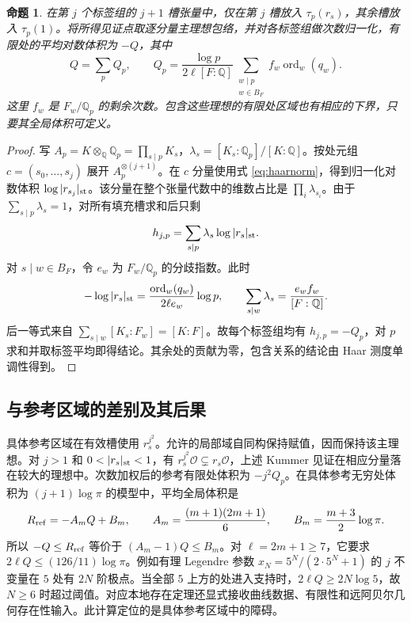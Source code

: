 \documentclass[UTF8,fontset=none,zihao=-4,a4paper]{ctexart}
\newtheorem{claim}{命题}
\newcommand{\OO}{\mathcal O}
\newcommand{\Q}{\mathbb Q}
\newcommand{\ord}{\operatorname{ord}}
\begin{document}
\begin{claim}
在第 \(j\) 个标签组的 \(j+1\) 槽张量中，仅在第 \(j\) 槽放入 \(\tau_p(r_s)\)，其余槽放入 \(\tau_p(1)\)。将所得见证点取逐分量主理想包络，并对各标签组做次数归一化，有限处的平均对数体积为 \(-Q\)，其中
\[
 Q=\sum_p Q_p,\qquad
 Q_p=\frac{\log p}{2\ell[F:\Q]}
      \sum_{\substack{w\mid p\\w\in B_F}} f_w\ord_w(q_w).
\]
这里 \(f_w\) 是 \(F_w/\Q_p\) 的剩余次数。包含这些理想的有限处区域也有相应的下界，只要其全局体积可定义。
\end{claim}
\begin{proof}
写 \(A_p=K\otimes_{\Q}\Q_p=\prod_{s\mid p}K_s\)，\(\lambda_s=[K_s:\Q_p]/[K:\Q]\)。按处元组 \(c=(s_0,\ldots,s_j)\) 展开 \(A_p^{\otimes(j+1)}\)。在 \(c\) 分量使用式 \eqref{eq:haarnorm}，得到归一化对数体积 \(\log|r_{s_j}|_{\rm st}\)。该分量在整个张量代数中的维数占比是 \(\prod_i\lambda_{s_i}\)。由于 \(\sum_{s\mid p}\lambda_s=1\)，对所有填充槽求和后只剩
\[
 h_{j,p}=\sum_{s\mid p}\lambda_s\log|r_s|_{\rm st}.
\]
对 \(s\mid w\in B_F\)，令 \(e_w\) 为 \(F_w/\Q_p\) 的分歧指数。此时
\[
 -\log|r_s|_{\rm st}=\frac{\ord_w(q_w)}{2\ell e_w}\log p,\qquad
 \sum_{s\mid w}\lambda_s=\frac{e_wf_w}{[F:\Q]}.
\]
后一等式来自 \(\sum_{s\mid w}[K_s:F_w]=[K:F]\)。故每个标签组均有 \(h_{j,p}=-Q_p\)，对 \(p\) 求和并取标签平均即得结论。其余处的贡献为零，包含关系的结论由 Haar 测度单调性得到。
\end{proof}

\subsection{与参考区域的差别及其后果}
具体参考区域在有效槽使用 \(r_s^{j^2}\)。允许的局部域自同构保持赋值，因而保持该主理想。对 \(j>1\) 和 \(0<|r_s|_{\rm st}<1\)，有 \(r_s^{j^2}\OO\subsetneq r_s\OO\)，上述 Kummer 见证在相应分量落在较大的理想中。次数加权后的参考有限处体积为 \(-j^2Q_p\)。在具体参考无穷处体积为 \((j+1)\log\pi\) 的模型中，平均全局体积是
\[
 R_{\rm ref}=-A_mQ+B_m,\qquad
 A_m=\frac{(m+1)(2m+1)}6,\qquad B_m=\frac{m+3}2\log\pi .
\]
所以 \(-Q\le R_{\rm ref}\) 等价于 \((A_m-1)Q\le B_m\)。对 \(\ell=2m+1\ge7\)，它要求 \(2\ell Q\le(126/11)\log\pi\)。例如有理 Legendre 参数 \(x_N=5^N/(2\cdot5^N+1)\) 的 \(j\) 不变量在 \(5\) 处有 \(2N\) 阶极点。当全部 \(5\) 上方的处进入支持时，\(2\ell Q\ge2N\log5\)，故 \(N\ge6\) 时超过阈值。对应本地存在定理还显式接收曲线数据、有限性和远阿贝尔几何存在性输入。此计算定位的是具体参考区域中的障碍。\cite{localref,adapt}
\end{document}
